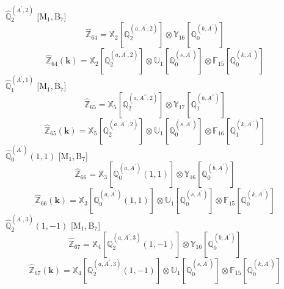 \documentclass[fleqn,10pt,landscape]{article}
\begin{document}
\begin{itemize}
\begin{dmath*}
\end{dmath*}
\vspace{4mm}
\noindent {} $\,\,\,\hat{\mathbb{Q}}_{2}^{(A^{\prime},2)}$ [M$_{1}$,\,B$_{7}$]
\begin{dmath*}
\hat{\mathbb{Z}}_{64}=\mathbb{X}_{2}[\mathbb{Q}_{2}^{(a,A^{\prime},2)}] \otimes\mathbb{Y}_{16}[\mathbb{Q}_{0}^{(b,A^{\prime})}]
\end{dmath*}
\begin{dmath*}
\hat{\mathbb{Z}}_{64}(\bm{k})=\mathbb{X}_{2}[\mathbb{Q}_{2}^{(a,A^{\prime},2)}] \otimes\mathbb{U}_{1}[\mathbb{Q}_{0}^{(s,A^{\prime})}] \otimes\mathbb{F}_{15}[\mathbb{Q}_{0}^{(k,A^{\prime})}]
\end{dmath*}
\vspace{4mm}
\noindent {} $\,\,\,\hat{\mathbb{Q}}_{1}^{(A^{\prime},1)}$ [M$_{1}$,\,B$_{7}$]
\begin{dmath*}
\hat{\mathbb{Z}}_{65}=\mathbb{X}_{5}[\mathbb{Q}_{2}^{(a,A^{\prime\prime},2)}] \otimes\mathbb{Y}_{17}[\mathbb{Q}_{1}^{(b,A^{\prime\prime})}]
\end{dmath*}
\begin{dmath*}
\hat{\mathbb{Z}}_{65}(\bm{k})=\mathbb{X}_{5}[\mathbb{Q}_{2}^{(a,A^{\prime\prime},2)}] \otimes\mathbb{U}_{1}[\mathbb{Q}_{0}^{(s,A^{\prime})}] \otimes\mathbb{F}_{16}[\mathbb{Q}_{1}^{(k,A^{\prime\prime})}]
\end{dmath*}
\vspace{4mm}
\noindent {} $\,\,\,\hat{\mathbb{Q}}_{0}^{(A^{\prime})}(1,1)$ [M$_{1}$,\,B$_{7}$]
\begin{dmath*}
\hat{\mathbb{Z}}_{66}=\mathbb{X}_{3}[\mathbb{Q}_{0}^{(a,A^{\prime})}(1,1)] \otimes\mathbb{Y}_{16}[\mathbb{Q}_{0}^{(b,A^{\prime})}]
\end{dmath*}
\begin{dmath*}
\hat{\mathbb{Z}}_{66}(\bm{k})=\mathbb{X}_{3}[\mathbb{Q}_{0}^{(a,A^{\prime})}(1,1)] \otimes\mathbb{U}_{1}[\mathbb{Q}_{0}^{(s,A^{\prime})}] \otimes\mathbb{F}_{15}[\mathbb{Q}_{0}^{(k,A^{\prime})}]
\end{dmath*}
\vspace{4mm}
\noindent {} $\,\,\,\hat{\mathbb{Q}}_{2}^{(A^{\prime},3)}(1,-1)$ [M$_{1}$,\,B$_{7}$]
\begin{dmath*}
\hat{\mathbb{Z}}_{67}=\mathbb{X}_{4}[\mathbb{Q}_{2}^{(a,A^{\prime},3)}(1,-1)] \otimes\mathbb{Y}_{16}[\mathbb{Q}_{0}^{(b,A^{\prime})}]
\end{dmath*}
\begin{dmath*}
\hat{\mathbb{Z}}_{67}(\bm{k})=\mathbb{X}_{4}[\mathbb{Q}_{2}^{(a,A^{\prime},3)}(1,-1)] \otimes\mathbb{U}_{1}[\mathbb{Q}_{0}^{(s,A^{\prime})}] \otimes\mathbb{F}_{15}[\mathbb{Q}_{0}^{(k,A^{\prime})}]

\end{dmath*}
\end{itemize}
\end{document}
